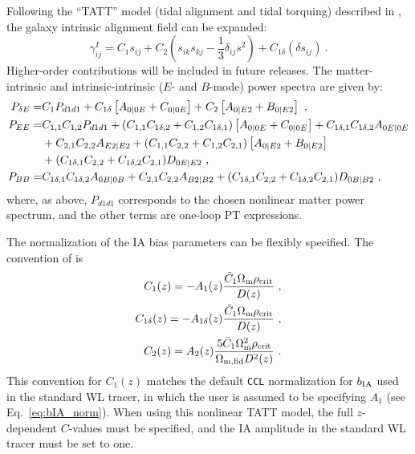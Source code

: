 \documentclass[\docopts]{\docclass}
\newcommand{\ccl}{{\tt CCL}\xspace}
\begin{document}
Following the ``TATT'' model (tidal alignment and tidal torquing) described in \cite{blazek19}, the galaxy intrinsic alignment field can be expanded:
\begin{equation}
    \gamma^{I}_{ij} = C_1 s_{ij} + C_2\left( s_{ik} s_{kj} - \frac{1}{3}\delta_{ij} s^2 \right) + C_{1\delta} (\delta s_{ij})~.
\end{equation}
Higher-order contributions will be included in future releases. The matter-intrinsic and intrinsic-intrinsic ($E$- and $B$-mode) power spectra are given by:
\begin{align}
\label{eq:dEtot}
P_{\delta E} =& C_1 P_{d1d1} + C_{1\delta} \left[A_{0|0E} + C_{0|0E}\right]
+ C_2 \left[ A_{0|E2} + B_{0|E2}\right]~, \\
\label{eq:EEtot}
P_{EE} =&
C_{1,1}C_{1,2} P_{d1d1} + (C_{1,1} C_{1\delta,2}+C_{1,2} C_{1\delta,1}) \left[A_{0|0E}+ C_{0|0E}\right] + C_{1\delta,1} C_{1\delta,2} A_{0E|0E} \notag\\
&+ C_{2,1} C_{2,2} A_{E2|E2} + (C_{1,1} C_{2,2} + C_{1,2} C_{2,1}) \left[ A_{0|E2} + B_{0|E2}\right] \notag \\
&+ (C_{1\delta,1} C_{2,2} + C_{1\delta,2} C_{2,1})D_{0E|E2}~,\\
\label{eq:BBtot}
P_{BB} =& C_{1\delta,1} C_{1\delta,2} A_{0B|0B} + C_{2,1} C_{2,2} A_{B2|B2} + (C_{1\delta,1} C_{2,2} + C_{1\delta,2} C_{2,1}) D_{0B|B2} ~,
\end{align}
where, as above, $P_{d1d1}$ corresponds to the chosen nonlinear matter power spectrum,
and the other terms are one-loop PT expressions.

The normalization of the IA bias parameters can be flexibly specified. The convention of \cite{blazek19} is
\begin{align}
    C_1(z) = - A_{1}(z) \frac{\bar{C}_1 \Omega_{\rm m} \rho_{\rm crit}}{D(z)}~, \\
    C_{1 \delta}(z) = - A_{1 \delta}(z) \frac{\bar{C}_1 \Omega_{\rm m} \rho_{\rm crit}}{D(z)}~, \\
    C_{2}(z) = A_{2}(z) \frac{5\bar{C}_1 \Omega^2_{\rm m} \rho_{\rm crit}}{\Omega_{\rm m,fid} D^2(z)}~.
\end{align}
This convention for $C_1(z)$ matches the default \ccl normalization for $b_{\rm IA}$ used in the standard WL tracer, in which the user is assumed to be specifying $A_{1}$ (see Eq.~\ref{eq:bIA_norm}). When using this nonlinear TATT model, the full $z$-dependent $C$-values must be specified, and the IA amplitude in the standard WL tracer must be set to one.
\end{document}
